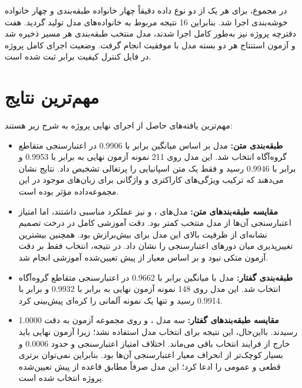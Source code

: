 در مجموع، برای هر یک از دو نوع داده دقیقاً چهار خانواده طبقه‌بندی و چهار خانواده خوشه‌بندی اجرا شد. بنابراین 16 نتیجه مربوط به خانواده‌های مدل تولید گردید. هفت دفترچه پروژه نیز به‌طور کامل اجرا شدند، مدل منتخب طبقه‌بندی هر مسیر ذخیره شد و آزمون استنتاج هر دو بسته مدل با موفقیت انجام گرفت. وضعیت اجرای کامل پروژه در فایل کنترل کیفیت برابر
ثبت شده است.


\section{مهم‌ترین نتایج}

مهم‌ترین یافته‌های حاصل از اجرای نهایی پروژه به شرح زیر هستند:

\begin{itemize}
	\item \textbf{طبقه‌بندی متن:}
	مدل
	بر اساس میانگین
	برابر با 0.9906 در اعتبارسنجی متقاطع گروه‌آگاه انتخاب شد. این مدل روی 211 نمونه آزمون نهایی به
	برابر با 0.9953 و
	برابر با 0.9946 رسید و فقط یک متن اسپانیایی را پرتغالی تشخیص داد. نتایج نشان می‌دهند که ترکیب ویژگی‌های کاراکتری و واژگانی برای زبان‌های موجود در این مجموعه‌داده مؤثر بوده است.

	\item \textbf{مقایسه طبقه‌بندهای متن:}
	مدل‌های
	،
	و
	نیز عملکرد مناسبی داشتند، اما امتیاز اعتبارسنجی آن‌ها از مدل منتخب کمتر بود. دقت آموزشی کامل در درخت تصمیم نشانه‌ای از ظرفیت بالای این مدل برای بیش‌برازش بود. همچنین
	بیشترین تغییرپذیری میان دورهای اعتبارسنجی را نشان داد. در نتیجه، انتخاب
	فقط بر دقت آزمون متکی نبود و بر اساس معیار از پیش تعیین‌شده آموزشی انجام شد.

	\item \textbf{طبقه‌بندی گفتار:}
	مدل
	با میانگین
	برابر با 0.9662 در اعتبارسنجی متقاطع گروه‌آگاه انتخاب شد. این مدل روی 148 نمونه آزمون نهایی به
	برابر با 0.9932 و
	برابر با 0.9914 رسید و تنها یک نمونه آلمانی را کره‌ای پیش‌بینی کرد.

	\item \textbf{مقایسه طبقه‌بندهای گفتار:}
	سه مدل
	،
	و
	روی مجموعه آزمون به دقت 1.0000 رسیدند. بااین‌حال، این نتیجه برای انتخاب مدل استفاده نشد؛ زیرا آزمون نهایی باید خارج از فرایند انتخاب باقی می‌ماند. اختلاف امتیاز اعتبارسنجی
	و
	حدود 0.0006 و بسیار کوچک‌تر از انحراف معیار اعتبارسنجی آن‌ها بود. بنابراین نمی‌توان برتری قطعی و عمومی
	را ادعا کرد؛ این مدل صرفاً مطابق قاعده از پیش تعیین‌شده پروژه انتخاب شده است.


\end{itemize}

